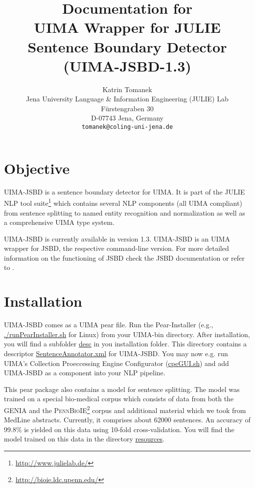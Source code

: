 \documentclass[11pt,a4paper,halfparskip]{scrartcl}
\title{\small{Documentation for}\\\huge UIMA Wrapper for JULIE Sentence Boundary Detector
  (UIMA-JSBD-1.3)}
\author{\normalsize Katrin Tomanek\\
  \normalsize  Jena University Language \& Information Engineering (JULIE) Lab\\
  \normalsize F\"urstengraben 30 \\
  \normalsize D-07743 Jena, Germany\\
  {\normalsize \tt tomanek@coling-uni-jena.de} }
\date{}
\begin{document}
\maketitle

\section{Objective}

UIMA-JSBD is a sentence boundary detector for UIMA.  It is part of
the JULIE NLP tool suite\footnote{\url{http://www.julielab.de/}} which
contains several NLP components (all UIMA compliant) from sentence
splitting to named entity recognition and normalization as well as a
comprehensive UIMA type system.

UIMA-JSBD is currently available in version 1.3. UIMA-JSBD is an UIMA
wrapper for JSBD, the respective command-line version. For more
detailed information on the functioning of JSBD check the JSBD
documentation or refer to \cite{Tomanek2007a}.

\section{Installation}

UIMA-JSBD comes as a UIMA pear file. Run the Pear-Installer (e.g.,
\url{./runPearInstaller.sh} for Linux) from your UIMA-bin directory.
After installation, you will find a subfolder \url{desc} in you
installation folder. This directory contains a descriptor
\url{SentenceAnnotator.xml} for UIMA-JSBD. You may now e.g. run UIMA's
Collection Proeccessing Engine Configurator (\url{cpeGUI.sh}) and add
UIMA-JSBD as a component into your NLP pipeline.

This pear package also contains a model for sentence splitting. The
model was trained on a special bio-medical corpus which consists of
data from both the GENIA \cite{Ohta2002} and the
\textsc{PennBioIE}\footnote{\url{http://bioie.ldc.upenn.edu/}} corpus
and additional material which we took from MedLine abstracts.
Currently, it comprises about 62000 sentences. An accuracy of 99.8\%
is yielded on this data using 10-fold cross-validation.  You will find
the model trained on this data in the directory \url{resources}.



\end{document}
